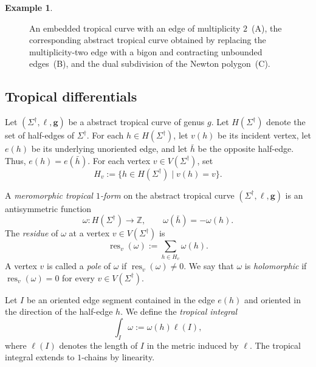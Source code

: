 \documentclass[12pt]{amsart}
\numberwithin{equation}{section}
\theoremstyle{definition}
\newtheorem{example}[theorem]{Example}
\newcommand{\Z}{\mathbb{Z}}
\def\vertices{V}
\def\res{\operatorname{res}}
\def\trop{\dagger}
\def\mcurve{\Sigma}
\def\tropmcurve{\mcurve^\trop}
\begin{document}
\begin{example}
\begin{figure}
\begin{subfigure}[c]{0.20\textwidth}

\caption{}
\label{fig:tropical-dual-subdivision}
\end{subfigure}

\caption{
An embedded tropical curve with an edge of multiplicity $2$~(A), the corresponding abstract tropical curve obtained by
replacing the multiplicity-two edge with a bigon and contracting unbounded edges~(B), and the
dual subdivision of the Newton polygon~(C).
}
\label{fig:embedded-abstract-dual-subdivision}
\end{figure}

\end{example}


\subsection{Tropical differentials}\label{sec:trop_diff}
Let $(\tropmcurve,\ell,\bm g)$ be a abstract tropical curve of genus $g$. Let $H(\tropmcurve)$ denote the set of half-edges of
$\tropmcurve$. For each $h\in H(\tropmcurve)$, let $v(h)$ be its
incident vertex, let $e(h)$ be its underlying unoriented edge, and let
$\bar h$ be the opposite half-edge. Thus, $
e(h)=e(\bar h).$ For each vertex $v\in\vertices(\tropmcurve)$, set
\[
H_v
:=
\{
h\in H(\tropmcurve)
\mid
v(h)=v
\}.
\]

A \emph{meromorphic tropical $1$-form} on the abstract tropical curve
$(\tropmcurve,\ell, \bm g)$ is an antisymmetric function
\[
\omega:H(\tropmcurve)\rightarrow\Z,
\qquad
\omega(\bar h)=-\omega(h).
\]
The \emph{residue} of $\omega$ at a vertex
$v\in\vertices(\tropmcurve)$ is
\[
\res_v(\omega)
:=
\sum_{h\in H_v}\omega(h).
\]
A vertex $v$ is called a \emph{pole} of $\omega$ if
$
\res_v(\omega)\neq 0.
$
We say that $\omega$ is \emph{holomorphic} if
$
\res_v(\omega)=0
$
for every $v\in\vertices(\tropmcurve)$.

Let $I$ be an oriented edge segment contained in the edge $e(h)$ and
oriented in the direction of the half-edge $h$. We define the
\emph{tropical integral}
\[
\int_I\omega
:=
\omega(h)\ell(I),
\]
where $\ell(I)$ denotes the length of $I$ in the metric induced by
$\ell$. The tropical integral extends to $1$-chains by linearity.
\end{document}
